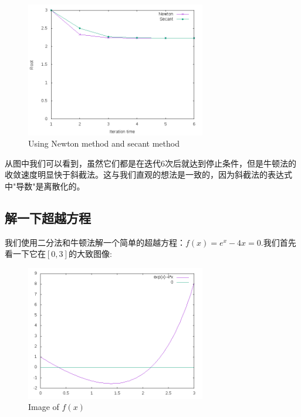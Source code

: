 \documentclass{ctexart}
\begin{document}
\begin{figure}[H]
  \centering
  \includegraphics[width=0.7\textwidth]{graph3.png}
  \caption{Using Newton method and secant method}
\end{figure}

从图中我们可以看到，虽然它们都是在迭代6次后就达到停止条件，但是牛顿法的收敛速度明显快于斜截法。这与我们直观的想法是一致的，因为斜截法的表达式中"导数"是离散化的。

\subsection{解一下超越方程}
我们使用二分法和牛顿法解一个简单的超越方程：$f(x)=e^x-4x=0$.我们首先看一下它在$[0,3]$的大致图像:

\begin{figure}[H]
  \centering
  \includegraphics[width=0.7\textwidth]{f.png}
  \caption{Image of $f(x)$}
\end{figure}
\end{document}
